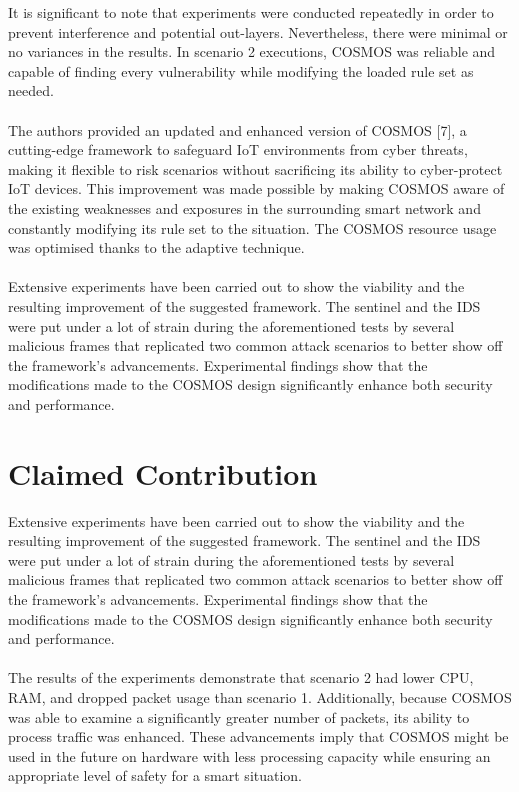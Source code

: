 \documentclass[12pt]{report}
\begin{document}
\noindent
It is significant to note that experiments were conducted repeatedly in order to prevent interference and potential out-layers. Nevertheless, there were minimal or no variances in the results. In scenario 2 executions, COSMOS was reliable and capable of finding every vulnerability while modifying the loaded rule set as needed.
\\ \\
The authors provided an updated and enhanced version of COSMOS [7], a cutting-edge framework to safeguard IoT environments from cyber threats, making it flexible to risk scenarios without sacrificing its ability to cyber-protect IoT devices. This improvement was made possible by making COSMOS aware of the existing weaknesses and exposures in the surrounding smart network and constantly modifying its rule set to the situation. The COSMOS resource usage was optimised thanks to the adaptive technique.
\\ \\
Extensive experiments have been carried out to show the viability and the resulting improvement of the suggested framework. The sentinel and the IDS were put under a lot of strain during the aforementioned tests by several malicious frames that replicated two common attack scenarios to better show off the framework's advancements. Experimental findings show that the modifications made to the COSMOS design significantly enhance both security and performance.

\section{Claimed Contribution}
\noindent
Extensive experiments have been carried out to show the viability and the resulting improvement of the suggested framework. The sentinel and the IDS were put under a lot of strain during the aforementioned tests by several malicious frames that replicated two common attack scenarios to better show off the framework's advancements. Experimental findings show that the modifications made to the COSMOS design significantly enhance both security and performance.
\\ \\
The results of the experiments demonstrate that scenario 2 had lower CPU, RAM, and dropped packet usage than scenario 1. Additionally, because COSMOS was able to examine a significantly greater number of packets, its ability to process traffic was enhanced. These advancements imply that COSMOS might be used in the future on hardware with less processing capacity while ensuring an appropriate level of safety for a smart situation.
\end{document}
